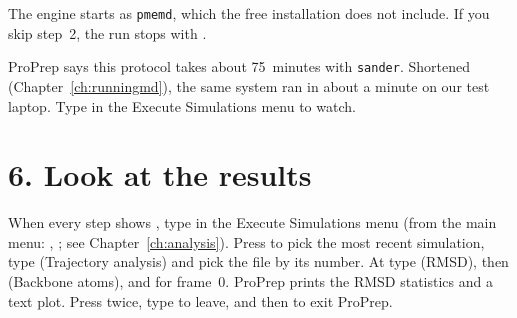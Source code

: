 \begin{watchout}
The engine starts as \texttt{pmemd}, which the free installation does not
include. If you skip step~2, the run stops with .
\end{watchout}

ProPrep says this protocol takes about 75~minutes with \texttt{sander}.
Shortened (Chapter~\ref{ch:runningmd}), the same system ran in about a minute
on our test laptop. Type  in the Execute Simulations menu to watch.

\section*{6. Look at the results}

When every step shows , type  in the Execute
Simulations menu (from the main menu: , ; see
Chapter~\ref{ch:analysis}). Press  to pick the most recent
simulation, type  (Trajectory analysis) and pick the  file by
its number. At  type  (RMSD), then 
(Backbone atoms), and  for frame~0. ProPrep prints the RMSD
statistics and a text plot. Press  twice, type  to leave, and
 then  to exit ProPrep.
